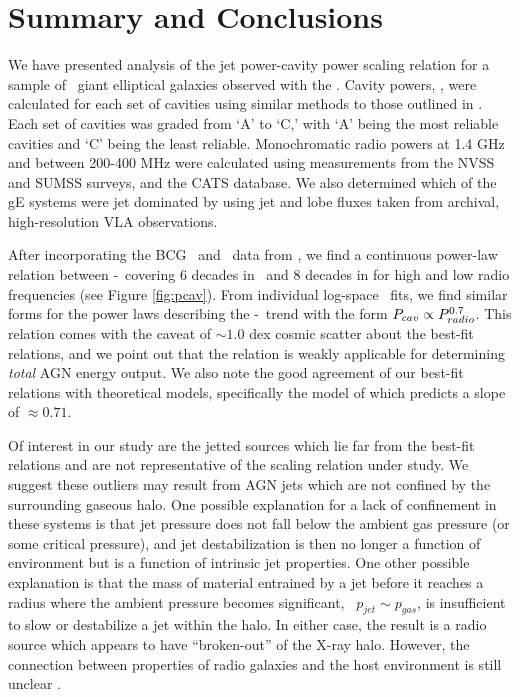 \documentclass{emulateapj}
\begin{document}
\section{Summary and Conclusions}
\label{sec:summary}

We have presented analysis of the jet power-cavity power scaling
relation for a sample of \samp\ giant elliptical galaxies observed
with the \cxo. Cavity powers, \pcav, were calculated for each set of
cavities using similar methods to those outlined in
\citet{rafferty06}. Each set of cavities was graded from `A' to `C,'
with `A' being the most reliable cavities and `C' being the least
reliable. Monochromatic radio powers at 1.4 GHz and between 200-400
MHz were calculated using measurements from the NVSS and SUMSS
surveys, and the CATS database. We also determined which of the gE
systems were jet dominated by using jet and lobe fluxes taken from
archival, high-resolution VLA observations.

After incorporating the BCG \pcav\ and \prad\ data from
\citet{birzan08}, we find a continuous power-law relation between
\pcav-\prad\ covering 6 decades in \prad\ and 8 decades in \pcav for
high and low radio frequencies (see Figure \ref{fig:pcav}). From
individual log-space \bces\ fits, we find similar forms for the power
laws describing the \pcav-\prad\ trend with the form $P_{cav} \propto
P_{radio}^{0.7}$. This relation comes with the caveat of $\sim 1.0$ dex
cosmic scatter about the best-fit relations, and we point out that the
relation is weakly applicable for determining {\it{total}} AGN energy
output. We also note the good agreement of our best-fit relations with
theoretical models, specifically the model of
\citet{1979ApJ...232...34B} which predicts a slope of $\approx 0.71$.

Of interest in our study are the jetted sources which lie far from the
best-fit relations and are not representative of the scaling relation
under study. We suggest these outliers may result from AGN jets which
are not confined by the surrounding gaseous halo. One possible
explanation for a lack of confinement in these systems is that jet
pressure does not fall below the ambient gas pressure (or some
critical pressure), and jet destabilization is then no longer a
function of environment but is a function of intrinsic jet
properties. One other possible explanation is that the mass of
material entrained by a jet before it reaches a radius where the
ambient pressure becomes significant, \eg\ $p_{jet} \sim p_{gas}$, is
insufficient to slow or destabilize a jet within the halo. In either
case, the result is a radio source which appears to have
``broken-out'' of the X-ray halo. However, the connection between
properties of radio galaxies and the host environment is still unclear
\citep[\eg][]{2008MNRAS.386.1709C}.
\end{document}
